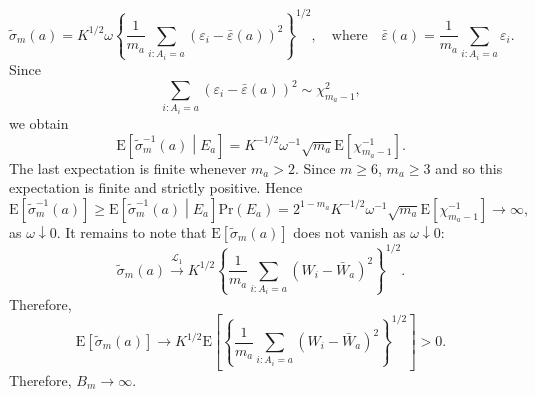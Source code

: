 \documentclass[aspectratio=169, 10pt]{beamer}
\theoremstyle{definition}
\theoremstyle{plain}
\def\Pr{\mathrm{Pr}}
\def\E{\mathrm{E}}
\begin{document}
\begin{frame}
\begin{equation*}
  \tilde{\sigma}_{m} (a) = K^{1/2} \omega \left\{ \frac{1}{m_{a}} \sum_{i :
  A_{i} = a} (\varepsilon_{i} - \bar{\varepsilon} (a))^{2} \right\}^{1/2}, \quad
  \text{where} \quad \bar{\varepsilon} (a) = \frac{1}{m_{a}} \sum_{i : A_{i} =
  a} \varepsilon_{i}.
\end{equation*}
Since
\begin{equation*}
  \sum_{i : A_{i} = a} (\varepsilon_{i} - \bar{\varepsilon} (a))^{2}
  \sim \chi^{2}_{m_{a} - 1},
\end{equation*}
we obtain
\begin{equation*}
  \E \left[ \tilde{\sigma}_{m}^{-1} (a) \middle| E_{a} \right] = K^{-1/2}
  \omega^{-1} \sqrt{m_{a}} \E \left[ \chi_{m_{a} - 1}^{-1} \right].
\end{equation*}
The last expectation is finite whenever \(m_{a} > 2\).
Since \(m \geq 6\), \(m_{a} \geq 3\) and so this expectation is finite and
strictly positive.
Hence
\begin{equation*}
  \E \left[ \tilde{\sigma}_{m}^{-1} (a) \right] \geq
  \E \left[ \tilde{\sigma}_{m}^{-1} (a) \middle| E_{a} \right] \Pr (E_{a}) =
  2^{1 - m_{a}} K^{-1/2} \omega^{-1} \sqrt{m_{a}} \E \left[ \chi_{m_{a} -
  1}^{-1} \right] \to \infty,
\end{equation*}
as \(\omega \downarrow 0\).
It remains to note that \(\E \left[ \tilde{\sigma}_{m} (a) \right]\)
does not vanish as \(\omega \downarrow 0\):
\begin{equation*}
  \tilde{\sigma}_{m} (a) \overset{\mathscr{L}_{1}}{\to}
  K^{1/2} \left\{ \frac{1}{m_{a}} \sum_{i : A_{i} = a} (W_{i} - \bar{W}_{a})^2
  \right\}^{1/2}.
\end{equation*}
Therefore,
\begin{equation*}
  \E \left[ \tilde{\sigma}_{m} (a) \right] \to
  K^{1/2} \E \left[ \left\{ \frac{1}{m_{a}} \sum_{i : A_{i} = a} (W_{i} -
  \bar{W}_{a})^{2} \right\}^{1/2} \right] > 0.
\end{equation*}
Therefore, \(B_{m} \to \infty\).
\end{frame}
\end{document}

